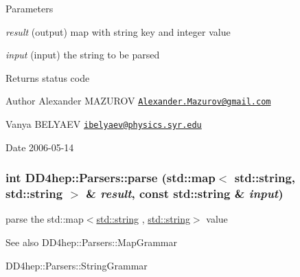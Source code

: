 \begin{DoxyParams}{Parameters}
\item[{\em result}](output) map with string key and integer value \item[{\em input}](input) the string to be parsed \end{DoxyParams}
\begin{DoxyReturn}{Returns}
status code
\end{DoxyReturn}
\begin{DoxyAuthor}{Author}
Alexander MAZUROV \href{mailto:Alexander.Mazurov@gmail.com}{\tt Alexander.Mazurov@gmail.com} 

Vanya BELYAEV \href{mailto:ibelyaev@physics.syr.edu}{\tt ibelyaev@physics.syr.edu} 
\end{DoxyAuthor}
\begin{DoxyDate}{Date}
2006-\/05-\/14 
\end{DoxyDate}
\hypertarget{namespace_d_d4hep_1_1_parsers_a5c68b3129b287e0e4c0a8aa6c97224d2}{
\subsubsection[{parse}]{\setlength{\rightskip}{0pt plus 5cm}int DD4hep::Parsers::parse (std::map$<$ std::string, std::string $>$ \& {\em result}, \/  const std::string \& {\em input})}}
\label{namespace_d_d4hep_1_1_parsers_a5c68b3129b287e0e4c0a8aa6c97224d2}


parse the {\ttfamily std::map$<$\hyperlink{classstd_1_1string}{std::string} , \hyperlink{classstd_1_1string}{std::string}$>$} value \begin{DoxySeeAlso}{See also}
DD4hep::Parsers::MapGrammar 

DD4hep::Parsers::StringGrammar 
\end{DoxySeeAlso}

